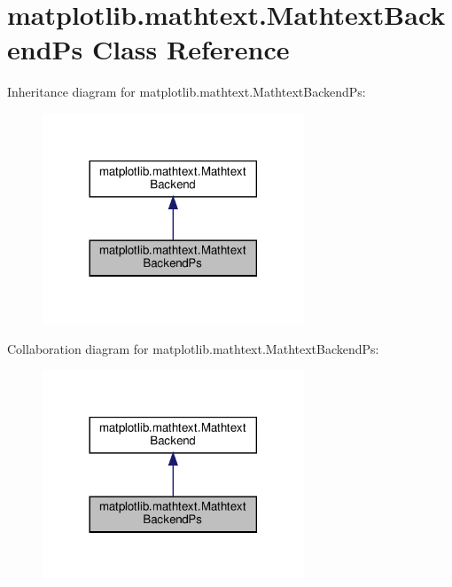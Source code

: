\hypertarget{classmatplotlib_1_1mathtext_1_1MathtextBackendPs}{}\section{matplotlib.\+mathtext.\+Mathtext\+Backend\+Ps Class Reference}
\label{classmatplotlib_1_1mathtext_1_1MathtextBackendPs}


Inheritance diagram for matplotlib.\+mathtext.\+Mathtext\+Backend\+Ps\+:
\nopagebreak
\begin{figure}[H]
\begin{center}
\leavevmode
\includegraphics[width=221pt]{classmatplotlib_1_1mathtext_1_1MathtextBackendPs__inherit__graph}
\end{center}
\end{figure}


Collaboration diagram for matplotlib.\+mathtext.\+Mathtext\+Backend\+Ps\+:
\nopagebreak
\begin{figure}[H]
\begin{center}
\leavevmode
\includegraphics[width=221pt]{classmatplotlib_1_1mathtext_1_1MathtextBackendPs__coll__graph}
\end{center}
\end{figure}
